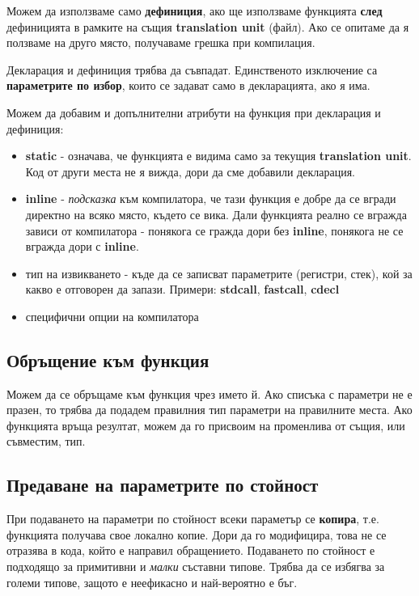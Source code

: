 \documentclass[fleqn,12pt]{article}
\begin{document}
Можем да използваме само \textbf{дефиниция}, ако ще използваме функцията \textbf{след} дефиницията в рамките на същия \textbf{translation unit} (файл).
Ако се опитаме да я ползваме на друго място, получаваме грешка при компилация.

Декларация и дефиниция трябва да съвпадат. Единственото изключение са \textbf{параметрите по избор}, които се задават само 
в декларацията, ако я има.

Можем да добавим и допълнителни атрибути на функция при декларация и дефиниция:
\begin{itemize}
    \item \textbf{static} - означава, че функцията е видима само за текущия \textbf{translation unit}. Код от други места не я вижда, дори да сме добавили декларация.
    \item \textbf{inline} - \textit{подсказка} към компилатора, че тази функция е добре да се вгради директно на всяко място, където се вика. Дали 
    функцията реално се вгражда зависи от компилатора - понякога се гражда дори без \textbf{inline}, понякога не се вгражда дори с \textbf{inline}.
    \item тип на извикването - къде да се записват параметрите (регистри, стек), кой за какво е отговорен да запази. Примери: \textbf{stdcall}, \textbf{fastcall}, \textbf{cdecl}
    \item специфични опции на компилатора
\end{itemize}

\subsection{Обръщение към функция}
Можем да се обръщаме към функция чрез името й. Ако списъка с параметри не е празен, то трябва да подадем правилния тип параметри на правилните места.
Ако функцията връща резултат, можем да го присвоим на променлива от същия, или съвместим, тип.

\subsection{Предаване на параметрите по стойност}
При подаването на параметри по стойност всеки параметър се \textbf{копира}, т.е. функцията получава свое локално копие. 
Дори да го модифицира, това не се отразява в кода, който е направил обращението. Подаването по стойност е подходящо за примитивни и 
\textit{малки} съставни типове. Трябва да се избягва за големи типове, защото е неефикасно и най-вероятно е бъг.
\end{document}
